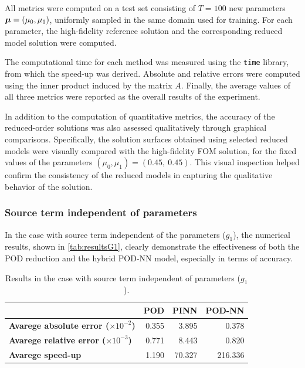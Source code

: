\documentclass[
    conference,
    nofonttune,
    11pt
]{IEEEtran}
\begin{document}
                All metrics were computed on a test set consisting of $T = 100$ new parameters ${\boldsymbol\mu} = (\mu_0, \mu_1)$, uniformly sampled in the same domain used for training. For each parameter, the high-fidelity reference solution and the corresponding reduced model solution were computed.
                
                The computational time for each method was measured using the \texttt{time} library, from which the speed-up was derived. Absolute and relative errors were computed using the inner product induced by the matrix $A$. Finally, the average values of all three metrics were reported as the overall results of the experiment.

                In addition to the computation of quantitative metrics, the accuracy of the reduced-order solutions was also assessed qualitatively through graphical comparisons. Specifically, the solution surfaces obtained using selected reduced models were visually compared with the high-fidelity FOM solution, for the fixed values of the parameters $(\mu_0, \mu_1) = (0.45,\ 0.45)$. This visual inspection helped confirm the consistency of the reduced models in capturing the qualitative behavior of the solution.
                
            \subsubsection{Source term independent of parameters}\label{secIndependentCase}

                In the case with source term independent of the parameters ($g_1$), the numerical results, shown in \autoref{tab:resultsG1}, clearly demonstrate the effectiveness of both the POD reduction and the hybrid POD-NN model, especially in terms of accuracy.

                \begin{table}[!ht]
                    \centering
                    \begin{tabular}{lrrr}
                        \textbf{} & \textbf{POD} & \textbf{PINN} & \textbf{POD-NN} \\ \hline
                        \textbf{Avarege absolute error ($\times10^{-2}$)} & 0.355 & 3.895 & 0.378 \\ 
                        \textbf{Avarege relative error ($\times10^{-3}$)} & 0.771 & 8.443 & 0.820 \\ 
                        \textbf{Avarege speed-up} & 1.190 & 70.327 & 216.336 \\ 
                    \end{tabular}
                    \caption{\label{tab:resultsG1} Results in the case with source term independent of parameters ($g_1$).}
                \end{table}
\end{document}
